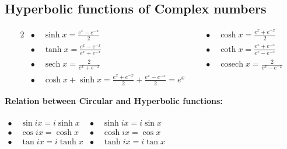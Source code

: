 \subsection{Hyperbolic functions of Complex numbers}
\begin{alignat*}{2}
&\bullet\quad \sinh x=\frac{e^{x}-e^{-x}}{2}\quad&&\bullet\quad \cosh x=\frac{e^{x}+e^{-x}}{2}\\
&\bullet\quad\tanh x=\frac{e^{x}-e^{-x}}{e^{x}+e^{-x}}\quad&&\bullet \quad {\coth} x=\frac{e^{x}+e^{-x}}{e^{x}-e^{-x}}
\\
&\bullet\quad{\operatorname{sech}} x=\frac{2}{e^{x}+e^{-x}} \quad&&\bullet \quad {\operatorname{cosech}} x=\frac{2}{e^{x}-e^{-x}}\\
&\bullet\quad\cosh x+\sinh x=\frac{e^{x}+e^{-x}}{2}+\frac{e^{x}-e^{-x}}{2}=e^{x} \quad&& \quad
\end{alignat*}
\begin{note}
\textbf{\textbf{Relation between Circular and Hyperbolic functions:}}\\\\
$\begin{array}{ll}\bullet\quad\sin i x=i \sinh x & \bullet\quad \sinh i x=i \sin x \\ \bullet\quad\cos i x=\cosh x & \bullet\quad \cosh i x=\cos x \\ \bullet\quad\tan i x=i \tanh x& \bullet\quad \tanh i x=i \tan x\end{array}$

\end{note}

